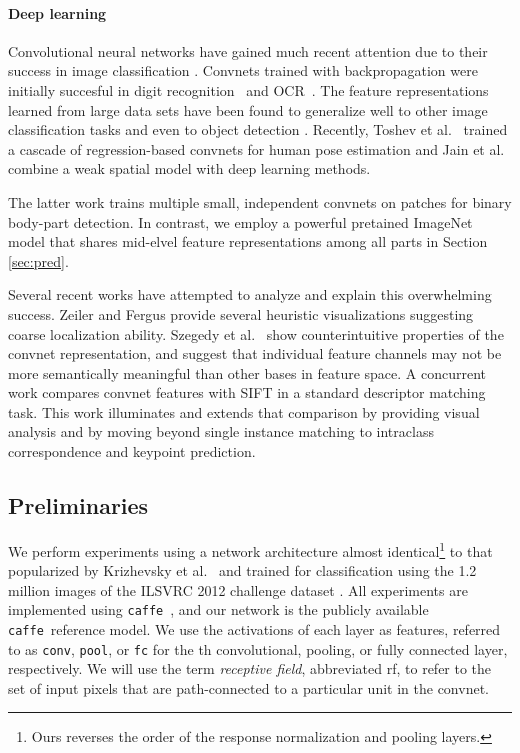 \documentclass{article} \usepackage{nips14submit_e,times}
\newcommand{\caffe}{\texttt{caffe}}
\begin{document}
\paragraph{Deep learning}
Convolutional neural networks have gained much recent attention due to their
success in image classification \cite{Krizhevsky}. Convnets trained with
backpropagation were initially
succesful in digit recognition~\cite{Lecun89} and OCR~\cite{Lecun98OCR}.
The feature representations learned from large data
sets have been found to generalize well to other image classification tasks
\cite{decaf} and even to object detection \cite{RossJeff, sermanet-cvpr13}.
Recently, Toshev et al.\ \cite{deep_pose} trained a cascade of regression-based
convnets for human pose estimation and Jain et al.\ \cite{HumanPoseICLR} combine
a weak spatial model with deep learning methods.

The latter work trains multiple small, independent convnets on  patches
for binary body-part detection. In contrast, we employ a powerful pretained
ImageNet model that shares mid-elvel feature representations among all parts
in Section \ref{sec:pred}.

Several recent works have attempted to analyze and explain this overwhelming
success. Zeiler and Fergus \cite{ZF} provide several heuristic visualizations
suggesting coarse localization ability.
Szegedy et al.\ \cite{Szegedy} show
counterintuitive properties of the convnet representation, and suggest that
individual feature channels may not be more semantically meaningful than other
bases in feature space.
A concurrent work \cite{Fischer}
compares convnet features with SIFT in a standard descriptor matching task.
This work illuminates and extends that comparison by providing visual analysis
and by moving beyond single instance matching to intraclass correspondence and keypoint prediction.

\subsection{Preliminaries}

We perform experiments using a network architecture almost
identical\footnote{Ours reverses the order of the response normalization and
pooling layers.} to that popularized by Krizhevsky et
al.\ \cite{Krizhevsky} and trained for classification using the 1.2 million
images of the ILSVRC 2012 challenge dataset \cite{ImageNet}.
All experiments are implemented using \caffe\ \cite{caffe}, and our network is
the publicly available \caffe\ reference model.
We use the activations of each layer as features, referred to as
\texttt{conv}, \texttt{pool}, or \texttt{fc} for the th convolutional,
pooling, or fully connected layer, respectively.
We will use the term \emph{receptive field}, abbreviated rf, to refer to the
set of input pixels that are path-connected to a particular unit in the convnet.
\end{document}
